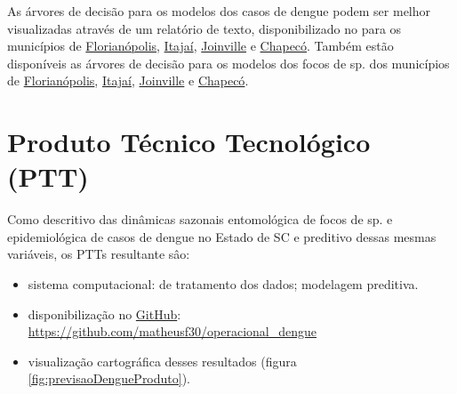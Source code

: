 \indent As árvores de decisão para os modelos  dos casos de dengue podem ser melhor visualizadas através de um relatório de texto, disponibilizado no  para os municípios de \href{https://github.com/matheusf30/dengue/blob/main/resultados/modelagem/importancia/arvore_decisao_modelo_RF_casos_FLORIANOPOLIS.txt}{Florianópolis}, \href{https://github.com/matheusf30/dengue/blob/main/resultados/modelagem/importancia/arvore_decisao_modelo_RF_casos_ITAJAI.txt}{Itajaí}, \href{https://github.com/matheusf30/dengue/blob/main/resultados/modelagem/importancia/arvore_decisao_modelo_RF_casos_JOINVILLE.txt}{Joinville} e \href{https://github.com/matheusf30/dengue/blob/main/resultados/modelagem/importancia/arvore_decisao_modelo_RF_casos_CHAPECO.txt}{Chapecó}. Também estão disponíveis as árvores de decisão para os modelos  dos focos de  sp. dos municípios de \href{https://github.com/matheusf30/dengue/blob/main/resultados/modelagem/importancia/arvore_decisao_modelo_RF_focos_FLORIANOPOLIS.txt}{Florianópolis}, \href{https://github.com/matheusf30/dengue/blob/main/resultados/modelagem/importancia/arvore_decisao_modelo_RF_focos_ITAJAI.txt}{Itajaí}, \href{https://github.com/matheusf30/dengue/blob/main/resultados/modelagem/importancia/arvore_decisao_modelo_RF_focos_JOINVILLE.txt}{Joinville} e \href{https://github.com/matheusf30/dengue/blob/main/resultados/modelagem/importancia/arvore_decisao_modelo_RF_focos_CHAPECO.txt}{Chapecó}.

\newpage
\section{Produto Técnico Tecnológico (PTT)}

\indent Como descritivo das dinâmicas sazonais entomológica de focos de  sp. e epidemiológica de casos de dengue no Estado de \acrlong{SC} e preditivo dessas mesmas variáveis, os \acrshort{PTT}s resultante sâo:

\begin{itemize}
  \item sistema computacional:
  \subitem {} de tratamento dos dados;
  \subitem modelagem preditiva.
  \item disponibilização  no \href{https://github.com/matheusf30/operacional_dengue}{GitHub}:
  \subitem \url{https://github.com/matheusf30/operacional_dengue}
  \item visualização cartográfica desses resultados (figura \ref{fig:previsaoDengueProduto}).
\end{itemize}

